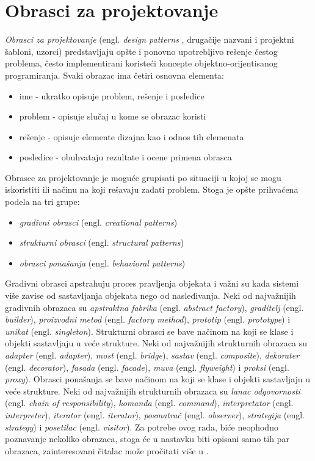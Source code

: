 \section{Obrasci za projektovanje}
\label{sec:DesignPatterns}

\emph{Obrasci za projektovanje} (engl. \emph{design patterns} \cite{DesignPatterns}, drugačije nazvani i projektni šabloni, uzorci) predstavljaju opšte i ponovno upotrebljivo rešenje čestog problema, često implementirani koristeći koncepte objektno-orijentisanog programiranja. Svaki obrazac ima četiri osnovna elementa:
\begin{itemize}
    \item ime - ukratko opisuje problem, rešenje i posledice
    \item problem - opisuje slučaj u kome se obrazac koristi
    \item rešenje - opisuje elemente dizajna kao i odnos tih elemenata
    \item posledice - obuhvataju rezultate i ocene primena obrasca
\end{itemize}

Obrasce za projektovanje je moguće grupisati po situaciji u kojoj se mogu iskoristiti ili načinu na koji rešavaju zadati problem. Stoga je opšte prihvaćena podela na tri grupe:
\begin{itemize}
    \item \emph{gradivni obrasci} (engl. \emph{creational patterns})
    \item \emph{strukturni obrasci} (engl. \emph{structural patterns})
    \item \emph{obrasci ponašanja} (engl. \emph{behavioral patterns})
\end{itemize}

Gradivni obrasci apstrahuju proces pravljenja objekata i važni su kada sistemi više zavise od sastavljanja objekata nego od nasleđivanja. Neki od najvažnijih gradivnih obrazaca su \emph{apstraktna fabrika} (engl. \emph{abstract factory}), \emph{graditelj} (engl. \emph{builder}), \emph{proizvodni metod} (engl. \emph{factory method}), \emph{prototip} (engl. \emph{prototype}) i \emph{unikat} (engl. \emph{singleton}). Strukturni obrasci se bave načinom na koji se klase i objekti sastavljaju u veće strukture. Neki od najvažnijih strukturnih obrazaca su \emph{adapter} (engl. \emph{adapter}), \emph{most} (engl. \emph{bridge}), \emph{sastav} (engl. \emph{composite}), \emph{dekorater} (engl. \emph{decorator}), \emph{fasada} (engl. \emph{facade}), \emph{muva} (engl. \emph{flyweight}) i \emph{proksi} (engl. \emph{proxy}). Obrasci ponašanja se bave načinom na koji se klase i objekti sastavljaju u veće strukture. Neki od najvažnijih strukturnih obrazaca su \emph{lanac odgovornosti} (engl. \emph{chain of responsibility}), \emph{komanda} (engl. \emph{command}), \emph{interpretator} (engl. \emph{interpreter}), \emph{iterator} (engl. \emph{iterator}), \emph{posmatrač} (engl. \emph{observer}), \emph{strategija} (engl. \emph{strategy}) i \emph{posetilac} (engl. \emph{visitor}). Za potrebe ovog rada, biće neophodno poznavanje nekoliko obrazaca, stoga će u nastavku biti opisani samo tih par obrazaca, zainteresovani čitalac može pročitati više u \cite{DesignPatternsBook}.


